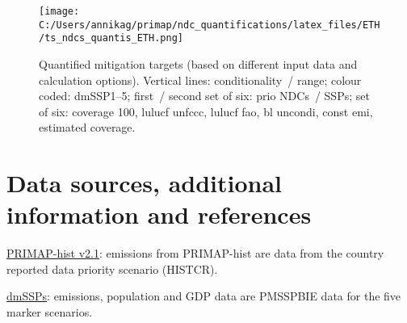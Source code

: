 \documentclass[12pt]{article}
\begin{document}
 \begin{figure}[H]
 \centering
 \texttt{[image: C:/Users/annikag/primap/ndc\_quantifications/latex\_files/ETH/ts\_ndcs\_quantis\_ETH.png]}
 \caption{Quantified mitigation targets (based on different input data and calculation options).
 Vertical lines: conditionality~/ range;
 colour coded: dmSSP1--5;
 first~/ second set of six: prio NDCs~/ SSPs;
 set of six: coverage 100, lulucf unfccc, lulucf fao, bl uncondi, const emi, estimated coverage.}
 \label{fig:miti}
 \end{figure}

 \newpage %
 \section{Data sources, additional information and references}
 \label{sec:dataSourcesRefs}

 \noindent \href{https://dataservices.gfz-potsdam.de/pik/showshort.php?id=escidoc:4736895}{PRIMAP-hist v2.1}: emissions from PRIMAP-hist are data from the country reported data priority scenario (HISTCR).

 \noindent \href{https://zenodo.org/record/3638137#.X2syXouxU2w}{dmSSPs}: emissions, population and GDP data are PMSSPBIE data for the five marker scenarios.
\end{document}
